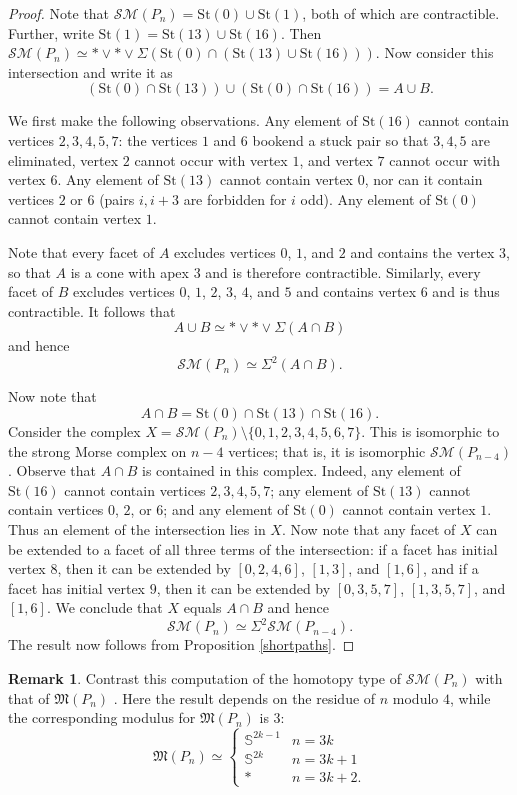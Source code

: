 \documentclass{amsart}
\theoremstyle{definition}
\newtheorem{remark}[theorem]{Remark}
\newcommand{\zs}{{\mathbb S}}
\newcommand{\sm}{{\mathcal{SM}}}
\begin{document}
\begin{proof}
    Note that $\sm(P_n) = \text{St}(0)\cup \text{St}(1)$, both of which are contractible. Further, write $\text{St}(1)=\text{St}(13)\cup \text{St}(16)$. Then $\sm(P_n)\simeq \ast\vee\ast\vee \Sigma(\text{St}(0)\cap(\text{St}(13)\cup \text{St}(16)))$. Now consider this intersection and write it as $$(\text{St}(0)\cap \text{St}(13))\cup (\text{St}(0)\cap \text{St}(16)) = A\cup B.$$ 

    We first make the following observations. Any element of $\text{St}(16)$ cannot contain vertices $2,3,4,5,7$:  the vertices $1$ and $6$ bookend a stuck pair so that $3,4,5$ are eliminated, vertex $2$ cannot occur with vertex $1$, and vertex $7$ cannot occur with vertex $6$. Any element of $\text{St}(13)$ cannot contain vertex $0$, nor can it contain vertices $2$ or $6$ (pairs $i,i+3$ are forbidden for $i$ odd). Any element of $\text{St}(0)$ cannot contain vertex $1$.
    
    Note that every facet of $A$ excludes vertices $0$, $1$, and $2$ and contains the vertex $3$, so that $A$ is a cone with apex $3$ and is therefore contractible. Similarly, every facet of $B$ excludes vertices $0$, $1$, $2$, $3$, $4$, and $5$ and contains vertex $6$ and is thus contractible. It follows that $$A\cup B \simeq \ast\vee\ast \vee\Sigma(A\cap B)$$ and hence $$\sm(P_n)\simeq \Sigma^2(A\cap B).$$
    
    Now note that $$A\cap B = \text{St}(0)\cap \text{St}(13)\cap \text{St}(16).$$ Consider the complex $X=\sm(P_n)\setminus\{0,1,2,3,4,5,6,7\}$. This is isomorphic to the strong Morse complex on $n-4$ vertices; that is, it is isomorphic $\sm(P_{n-4})$. Observe that $A\cap B$ is contained in this complex. Indeed, any element of $\text{St}(16)$ cannot contain vertices $2,3,4,5,7$; any element of $\text{St}(13)$ cannot contain vertices $0$, $2$, or $6$; and any element of $\text{St}(0)$ cannot contain vertex $1$. Thus an element of the intersection lies in $X$. Now note that any facet of $X$ can be extended to a facet of all three terms of the intersection: if a facet has initial vertex $8$, then it can be extended by $[0,2,4,6]$, $[1,3]$, and $[1,6]$, and if a facet has initial vertex $9$, then it can be extended by $[0,3,5,7]$, $[1,3,5,7]$, and $[1,6]$. We conclude that $X$ equals $A\cap B$ and hence $$\sm(P_n)\simeq \Sigma^2\sm(P_{n-4}).$$ The result now follows from Proposition \ref{shortpaths}.
\end{proof}

\begin{remark}
    Contrast this computation of the homotopy type of $\sm(P_n)$ with that of ${\mathfrak M}(P_n)$ \cite[Prop. 4.6]{Kozlov1999}. Here the result depends on the residue of $n$ modulo $4$, while the corresponding modulus for ${\mathfrak M}(P_n)$ is $3$: $${\mathfrak M}(P_n) \simeq \begin{cases}
        \zs^{2k-1} & n=3k \\
        \zs^{2k} & n=3k+1 \\
        \ast & n=3k+2.
    \end{cases}$$
\end{remark}
\end{document}
